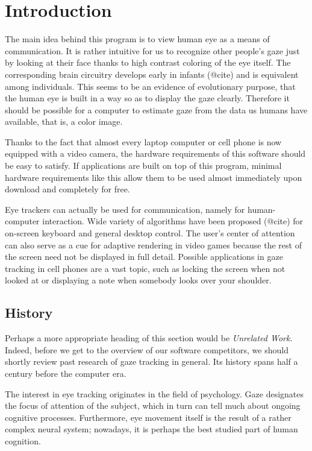 \chapter{Introduction}

The main idea behind this program is to view human eye as a means of communication.
It is rather intuitive for us to recognize other people's gaze just by looking at their face thanks to high contrast coloring of the eye itself.
The corresponding brain circuitry develops early in infants (@cite) and is equivalent among individuals.
This seems to be an evidence of evolutionary purpose, that the human eye is built in a way so as to display the gaze clearly.
Therefore it should be possible for a computer to estimate gaze from the data us humans have available, that is, a color image.

Thanks to the fact that almost every laptop computer or cell phone is now equipped with a video camera, the hardware requirements of this software should be easy to satisfy.
If applications are built on top of this program, minimal hardware requirements like this allow them to be used almost immediately upon download and completely for free.

Eye trackers can actually be used for communication, namely for human-computer interaction.
Wide variety of algorithms have been proposed (@cite) for on-screen keyboard and general desktop control.
The user's center of attention can also serve as a cue for adaptive rendering in video games because the rest of the screen need not be displayed in full detail.
Possible applications in gaze tracking in cell phones are a vast topic, such as locking the screen when not looked at or displaying a note when somebody looks over your shoulder.

\section{History}

Perhaps a more appropriate heading of this section would be \textit{Unrelated Work}.
Indeed, before we get to the overview of our software competitors, we should shortly review past research of gaze tracking in general.
Its history spans half a century before the computer era.

The interest in eye tracking originates in the field of psychology.
Gaze designates the focus of attention of the subject, which in turn can tell much about ongoing cognitive processes.
Furthermore, eye movement itself is the result of a rather complex neural system; nowadays, it is perhaps the best studied part of human cognition.

